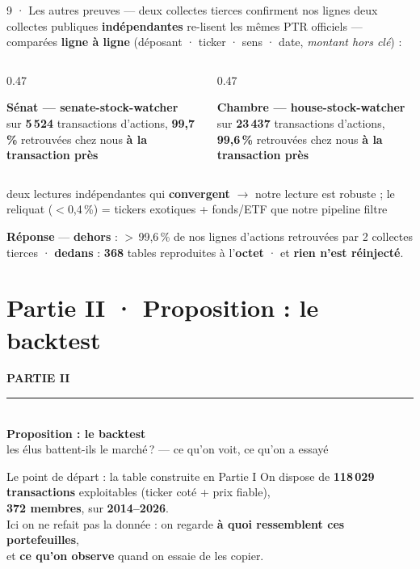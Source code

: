 \documentclass[11pt,aspectratio=169]{beamer}
\newcommand{\carte}[3]{%
  \colorbox{#1!10}{\parbox[t][23mm][t]{\dimexpr\linewidth-8pt}{\vspace{1mm}
    {\color{#1}\footnotesize\textbf{#2}}\\[0.8mm]{\scriptsize #3}}}}
\newcommand{\repband}[1]{%
  \colorbox{okgreen!12}{\parbox{\dimexpr\textwidth-10pt}{\scriptsize
    \textbf{\textcolor{okgreen}{Réponse}}\; --- #1}}}
\newcommand{\chambre}{\textcolor{helec}{\textbf{Chambre}}}
\newcommand{\senat}{\textcolor{selec}{\textbf{Sénat}}}
\newcommand{\partdivider}[4]{%
  {\setbeamercolor{background canvas}{bg=#1}
  \begin{frame}[plain]
    \centering\vfill
    {\color{white}\Large\textbf{#2}}\\[3.5mm]
    {\color{white!75}\rule{0.40\textwidth}{1pt}}\\[4.5mm]
    {\color{white}\fontsize{32}{36}\selectfont\textbf{#3}}\\[5.5mm]
    {\color{white!88}\large #4}
    \vfill
  \end{frame}}}
\begin{document}
\begin{frame}{9 · Les autres preuves --- deux collectes tierces confirment nos lignes}
  \centering
  \vspace{0.5mm}
  {\footnotesize deux collectes publiques \textbf{indépendantes} re-lisent les mêmes PTR officiels ---
   comparées \textbf{ligne à ligne} (déposant · ticker · sens · date, \emph{montant hors clé}) :}\\[3.5mm]
  \begin{columns}[T]
    \begin{column}{0.47\textwidth}
      \carte{selec}{\senat{} --- senate-stock-watcher}{sur \textbf{5\,524} transactions d'actions,
        \textbf{99,7\,\%} retrouvées chez nous \textbf{à la transaction près}}
    \end{column}\hfill
    \begin{column}{0.47\textwidth}
      \carte{helec}{\chambre{} --- house-stock-watcher}{sur \textbf{23\,437} transactions d'actions,
        \textbf{99,6\,\%} retrouvées chez nous \textbf{à la transaction près}}
    \end{column}
  \end{columns}
  \vspace{2.5mm}

  {\scriptsize\color{black!60} deux lectures indépendantes qui \textbf{convergent} $\rightarrow$ notre
   lecture est robuste ; le reliquat ($<$0,4\,\%) = tickers exotiques + fonds/ETF que notre pipeline filtre}\\[4mm]
  \repband{\textbf{dehors} : $>$\,99,6\,\% de nos lignes d'actions retrouvées par 2 collectes tierces ·
   \textbf{dedans} : \textbf{368} tables reproduites à l'\textbf{octet} · et \textbf{rien n'est réinjecté}.}
\end{frame}

\section{Partie II · Proposition : le backtest}
\partdivider{helec}{PARTIE II}{Proposition : le backtest}{les élus battent-ils le marché\,? --- ce qu'on voit, ce qu'on a essayé}

\begin{frame}{Le point de départ : la table construite en Partie I}
  \centering\vfill
  {\large On dispose de \textbf{118\,029 transactions} exploitables (ticker coté + prix fiable),\\[1mm] \textbf{372 membres}, sur \textbf{2014--2026}.}\\[5mm]
  {\footnotesize Ici on ne refait pas la donnée : on regarde \textbf{à quoi ressemblent ces portefeuilles},\\ et \textbf{ce qu'on observe} quand on essaie de les copier.}
  \vfill
\end{frame}
\end{document}
